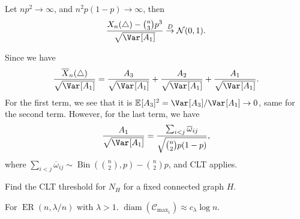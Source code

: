 \begin{claim}
	Let \(np^2 \to \infty \), and \(n^2 p(1 - p) \to \infty \), then
	\[
		\frac{X_n(\triangle ) - \binom{n}{3}p^3}{\sqrt{\Var_{}[A_1] } }
		\overset{D}{\to} \mathcal{N} (0, 1).
	\]
\end{claim}
\begin{explanation}
	Since we have
	\[
		\frac{\overline{X} _n(\triangle )}{\sqrt{\Var_{}[A_1] } }
		= \frac{A_3}{\sqrt{\Var_{}[A_1] } } + \frac{A_2}{\sqrt{\Var_{}[A_1] } } + \frac{A_1}{\sqrt{\Var_{}[A_1] } }.
	\]
	For the first term, we see that it is \(\mathbb{E}_{}[A_3] ^2 = \Var_{}[A_3] / \Var_{}[A_1] \to 0\), same for the second term. However, for the last term, we have
	\[
		\frac{A_1}{\sqrt{\Var_{}[A_1] } }
		= \frac{\sum_{i < j} \overline{\omega }_{ij} }{\sqrt{\binom{n}{2} p (1 - p)} },
	\]
	where \(\sum_{i < j} \overline{\omega }_{ij} \sim \operatorname{Bin}(\binom{n}{2}, p) - \binom{n}{2}p \), and CLT applies.
\end{explanation}

\begin{exercise}
	Find the CLT threshold for \(N_H\) for a fixed connected graph \(H\).
\end{exercise}

\begin{theorem}
	For \(\operatorname{ER}(n, \lambda / n) \) with \(\lambda > 1\). \(\operatorname{diam}(\mathcal{C} _{\max _1}) \approx c_\lambda \log n\).
\end{theorem}